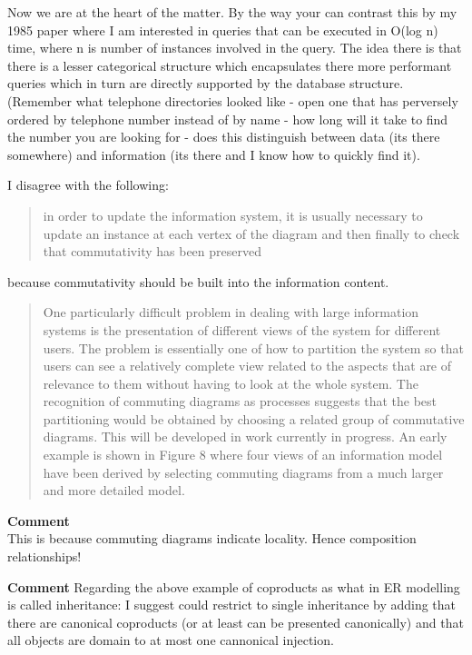 \documentclass[11pt,a4paper]{scrartcl}
\begin{document}
Now we are at the heart of the matter. By the way your can contrast this by my 1985 paper where I am interested in queries that can
be executed in O(log n) time, where n is number of instances involved in the query. The idea there is that there is a lesser
categorical structure which encapsulates there more performant queries which in turn are directly supported by the database structure.
(Remember what telephone directories looked like - open one that has perversely ordered by telephone number instead of by name -
how long will it take to find the number you are looking for - does this distinguish between data (its there somewhere) and information
(its there and I know how to quickly find it).  


I disagree with the following:
\begin{quote}
in order to update the information system, it is usually necessary to
update an instance at each vertex of the diagram and then finally to check that
commutativity has been preserved
\end{quote}
because commutativity should be built into the information content.

\begin{quote}
One particularly difficult problem in dealing with large information systems
is the presentation of different views of the system for different users. The
problem is essentially one of how to partition the system so that users can see
a relatively complete view related to the aspects that are of relevance to them
without having to look at the whole system. The recognition of commuting
diagrams as processes suggests that the best partitioning would be obtained
by choosing a related group of commutative diagrams. This will be developed
in work currently in progress. An early example is shown in Figure 8 where
four views of an information model have been derived by selecting commuting
diagrams from a much larger and more detailed model.
\end{quote}
\textbf{Comment}\\

This is because commuting diagrams indicate locality. Hence composition relationships!

\textbf{Comment}
Regarding the above example of coproducts as what in ER modelling is called inheritance: I suggest could restrict to single inheritance by adding that
there are canonical coproducts (or at least can be presented canonically) and that all objects are domain to at most
one cannonical injection. 
\end{document}
